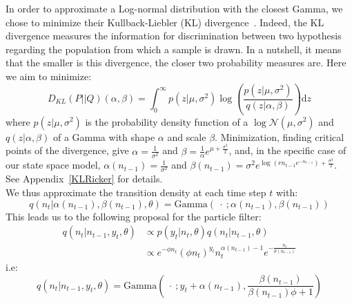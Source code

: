 \documentclass[12pt]{article}
\begin{document}
	In order to approximate a Log-normal distribution with the closest Gamma, we chose to minimize their Kullback-Liebler (KL) divergence~\cite{kullback1951information}. Indeed, the KL divergence measures the information for discrimination between two hypothesis regarding the population from which a sample is drawn. In a nutshell, it means that the smaller is this divergence, the closer two probability measures are. Here we aim to minimize:
	\begin{equation}
	D_{KL}(P||Q)(\alpha, \beta) = \int_{0}^{\infty}{p(z|\mu, \sigma^2)\log(\frac{p(z|\mu, \sigma^2)}{q(z|\alpha, \beta)})\mathrm{d}z}
	\end{equation}
	where $p(z|\mu, \sigma^2)$ is the probability density function of a $\log\mathcal{N}(\mu, \sigma^2)$ and $q(z|\alpha, \beta)$ of a Gamma with shape $\alpha$ and scale $\beta$. Minimization, finding critical points of the divergence, give $\alpha =\frac{1}{\sigma^2}$ and $\beta=\frac{1}{\alpha}e^{\mu+\frac{\sigma^2}{2}}$, and, in the specific case of our state space model, $\alpha(n_{t-1})= \frac{1}{\sigma^2}$ and $\beta(n_{t-1})=\sigma^2e^{\log(rn_{t-1}e^{-n_{t-1}})+\frac{\sigma^2}{2}}$. See Appendix~\ref{KLRicker} for details. \\
	We thus approximate the transition density at each time step $t$ with:
	\begin{equation*}
	q(n_t|\alpha(n_{t-1}), \beta(n_{t-1}), \theta) = \mathrm{Gamma}(\ \cdot \ ; \alpha(n_{t-1}), \beta(n_{t-1}) )
	\end{equation*}
	This leads us to the following proposal for the particle filter:
	\begin{equation*}
	\begin{split}
	q(n_t|n_{t-1}, y_t, \theta) & \propto  p(y_t|n_t, \theta)q(n_t|n_{t-1}, \theta) \\
	& \propto e^{-\phi n_t}(\phi n_t)^{y_t}n_t^{\alpha(n_{t-1})-1}e^{-\frac{n_t}{\theta(n_{t-1})}}
	\end{split}
	\end{equation*}
	i.e:
	\begin{equation*}
	q(n_t|n_{t-1}, y_t, \theta) = \mathrm{Gamma}(\ \cdot \ ; y_t+\alpha(n_{t-1}), \frac{\beta(n_{t-1})}{\beta(n_{t-1})\phi + 1})\end{equation*}
	
\end{document}
